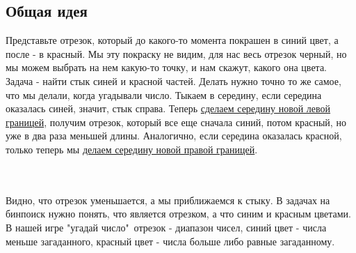 \documentclass[12pt]{article} %
\begin{document}
\subsection{Общая идея}
Представьте отрезок, который до какого-то момента покрашен в синий цвет, а после - в красный. Мы эту покраску не видим, для нас весь отрезок черный, но мы можем выбрать на нем какую-то точку, и нам скажут, какого она цвета. Задача - найти стык синей и красной частей. Делать нужно точно то же самое, что мы делали, когда угадывали число. Тыкаем в середину, если середина оказалась синей, значит, стык справа. Теперь \underline{сделаем середину новой левой границей}, получим отрезок, который все еще сначала синий, потом красный, но уже в два раза меньшей длины. Аналогично, если середина оказалась красной, только теперь мы \underline{делаем середину новой правой границей}.\\
\\
\\
Видно, что отрезок уменьшается, а мы приближаемся к стыку. В задачах на бинпоиск нужно понять, что является отрезком, а что синим и красным цветами. В нашей игре "угадай число"\ отрезок - диапазон чисел, синий цвет - числа меньше загаданного, красный цвет - числа больше либо равные загаданному. 
\end{document}
